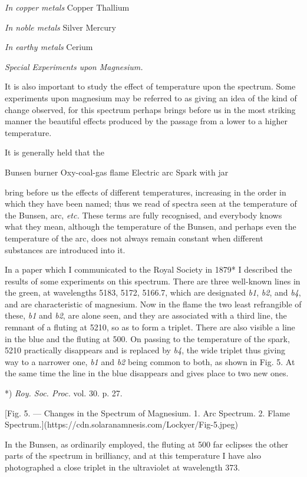 \documentclass[a4paper, 12pt, oneside, polutonikogreek, english]{article}
\begin{document}
\emph{In copper metals} 
Copper 
Thallium 

\emph{In noble metals} 
Silver 
Mercury 

\emph{In earthy metals} 
Cerium  

\emph{Special Experiments upon Magnesium.}

It is also important to study the effect of temperature upon the spectrum. Some experiments upon magnesium may be referred to as giving an idea of the kind of change observed, for this spectrum perhaps brings before us in the most striking manner the beautiful effects produced by the passage from a lower to a higher temperature.

It is generally held that the

Bunsen burner 
Oxy-coal-gas flame 
Electric arc Spark with jar 

bring before us the effects of different temperatures, increasing in the order in which they have been named; thus we read of spectra seen at the temperature of the Bunsen, arc, \emph{etc.} These terms are fully recognised, and everybody knows what they mean, although the temperature of the Bunsen, and perhaps even the temperature of the arc, does not always remain constant when different substances are introduced into it.

In a paper which I communicated to the Royal Society in 1879* I described the results of some experiments on this spectrum. There are three well-known lines in the green, at wavelengths 5183, 5172, 5166.7, which are designated \emph{b1}, \emph{b2}, and \emph{b4}, and are characteristic of magnesium. Now in the flame the two least refrangible of these, \emph{b1} and \emph{b2}, are alone seen, and they are associated with a third line, the remnant of a fluting at 5210, so as to form a triplet. There are also visible a line in the blue and the fluting at 500. On passing to the temperature of the spark, 5210 practically disappears and is replaced by \emph{b4}, the wide triplet thus giving way to a narrower one, \emph{b1} and \emph{b2} being common to both, as shown in Fig. 5. At the same time the line in the blue disappears and gives place to two new ones.

*) \emph{Roy. Soc. Proc.} vol. 30. p. 27.

[Fig. 5. --- Changes in the Spectrum of Magnesium. 1. Arc Spectrum. 2. Flame Spectrum.](https://cdn.solaranamnesis.com/Lockyer/Fig-5.jpeg)

In the Bunsen, as ordinarily employed, the fluting at 500 far eclipses the other parts of the spectrum in brilliancy, and at this temperature I have also photographed a close triplet in the ultraviolet at wavelength 373.
\end{document}
